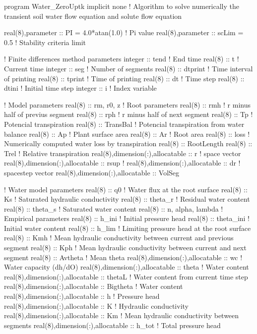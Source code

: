 \begtt

program Water_ZeroUptk
implicit none
! Algorithm to solve numerically the transient soil water flow equation and solute flow equation

real(8),parameter :: PI = 4.0*atan(1.0)		! Pi value
real(8),parameter :: scLim = 0.5		! Stability criteria limit

! Finite differences method parameters
integer :: tend				  	! End time
real(8) :: t				  	! Current time
integer :: seg 				  	! Number of segments
real(8) :: dtprint			  	! Time interval of printing
real(8) :: tprint				! Time of printing
real(8) :: dt				  	! Time step
real(8) :: dtini				! Initial time step
integer :: i				  	! Index variable

! Model parameters
real(8) :: rm, r0, z 				! Root parameters
real(8) :: rmh					! r minus half of previus segment
real(8) :: rph					! r minus half of next segment
real(8) :: Tp					! Potencial transpiration
real(8) :: TransBal				! Potencial transpiration from water balance
real(8) :: Ap					! Plant surface area
real(8) :: Ar					! Root area
real(8) :: loss					! Numerically computed water loss by transpiration
real(8) :: RootLength
real(8) :: Trel					! Relative transpiration
real(8),dimension(:),allocatable :: r     	! space vector
real(8),dimension(:),allocatable :: rsup     	!
real(8),dimension(:),allocatable :: dr     	! spacestep vector
real(8),dimension(:),allocatable :: VolSeg     	

! Water model parameters
real(8) :: q0					! Water flux at the root surface
real(8) :: Ks				  	! Saturated hydraulic conductivity
real(8) :: theta_r				! Residual water content
real(8) :: theta_s				! Saturated water content
real(8) :: n, alpha, lambda			! Empirical parameters
real(8) :: h_ini				! Initial pressure head
real(8) :: theta_ini				! Initial water content
real(8) :: h_lim				! Limiting pressure head at the root surface
real(8) :: Kmh					! Mean hydraulic conductivity between current and previous segment
real(8) :: Kph					! Mean hydraulic conductivity between current and next segment
real(8) :: Avtheta				! Mean theta
real(8),dimension(:),allocatable :: wc    	! Water capacity (dh/dO)
real(8),dimension(:),allocatable :: theta	! Water content 
real(8),dimension(:),allocatable :: thetaL	! Water content from current time step
real(8),dimension(:),allocatable :: Bigtheta	! Water content 
real(8),dimension(:),allocatable :: h		! Pressure head
real(8),dimension(:),allocatable :: K		! Hydraulic conductivity
real(8),dimension(:),allocatable :: Km		! Mean hydraulic conductivity between segments
real(8),dimension(:),allocatable :: h_tot	! Total pressure head

